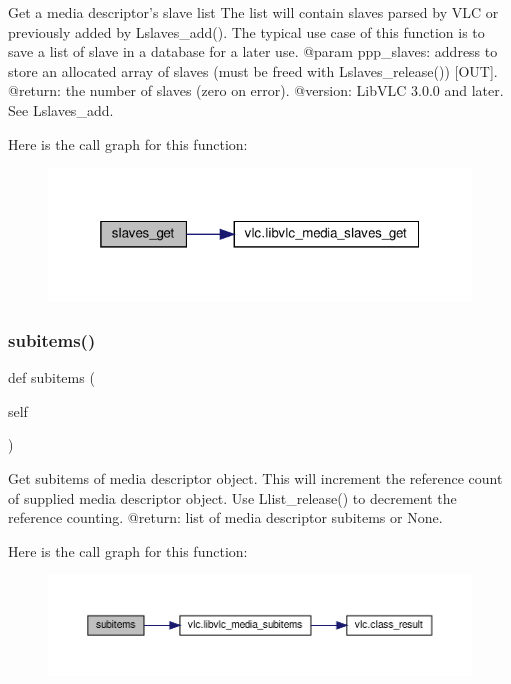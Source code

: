 \begin{DoxyVerb}Get a media descriptor's slave list
The list will contain slaves parsed by VLC or previously added by
L{slaves_add}(). The typical use case of this function is to save
a list of slave in a database for a later use.
@param ppp_slaves: address to store an allocated array of slaves (must be freed with L{slaves_release}()) [OUT].
@return: the number of slaves (zero on error).
@version: LibVLC 3.0.0 and later. See L{slaves_add}.
\end{DoxyVerb}
 Here is the call graph for this function\+:
\nopagebreak
\begin{figure}[H]
\begin{center}
\leavevmode
\includegraphics[width=319pt]{classvlc_1_1_media_a895c439fea0ce42b559aca5624857490_cgraph}
\end{center}
\end{figure}
\mbox{\label{classvlc_1_1_media_a5ce1777be74ad9a14c8e7730d0d67b21}} 
\subsubsection{\texorpdfstring{subitems()}{subitems()}}
{\footnotesize\ttfamily def subitems (\begin{DoxyParamCaption}\item[{}]{self }\end{DoxyParamCaption})}

\begin{DoxyVerb}Get subitems of media descriptor object. This will increment
the reference count of supplied media descriptor object. Use
L{list_release}() to decrement the reference counting.
@return: list of media descriptor subitems or None.
\end{DoxyVerb}
 Here is the call graph for this function\+:
\nopagebreak
\begin{figure}[H]
\begin{center}
\leavevmode
\includegraphics[width=350pt]{classvlc_1_1_media_a5ce1777be74ad9a14c8e7730d0d67b21_cgraph}
\end{center}
\end{figure}
\mbox{\label{classvlc_1_1_media_a63becd5b42e2d084abff82ae94d284ba}} 
